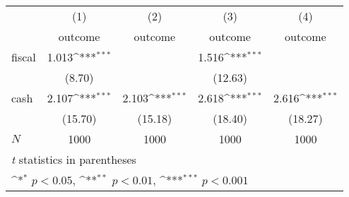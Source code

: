 {
\def\sym#1{\ifmmode^{#1}\else\(^{#1}\)\fi}
\begin{tabular}{l*{4}{c}}
\hline\hline
            &\multicolumn{1}{c}{(1)}&\multicolumn{1}{c}{(2)}&\multicolumn{1}{c}{(3)}&\multicolumn{1}{c}{(4)}\\
            &\multicolumn{1}{c}{outcome}&\multicolumn{1}{c}{outcome}&\multicolumn{1}{c}{outcome}&\multicolumn{1}{c}{outcome}\\
\hline
fiscal      &       1.013\sym{***}&                     &       1.516\sym{***}&                     \\
            &      (8.70)         &                     &     (12.63)         &                     \\
[1em]
cash        &       2.107\sym{***}&       2.103\sym{***}&       2.618\sym{***}&       2.616\sym{***}\\
            &     (15.70)         &     (15.18)         &     (18.40)         &     (18.27)         \\
\hline
\(N\)       &        1000         &        1000         &        1000         &        1000         \\
\hline\hline
\multicolumn{5}{l}{\footnotesize \textit{t} statistics in parentheses}\\
\multicolumn{5}{l}{\footnotesize \sym{*} \(p<0.05\), \sym{**} \(p<0.01\), \sym{***} \(p<0.001\)}\\
\end{tabular}
}
